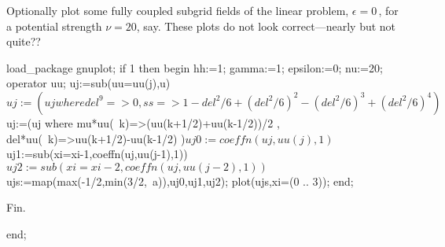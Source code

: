 \documentclass[12pt,a5paper]{article}
\begin{document}
Optionally plot some fully coupled subgrid fields of the linear problem, \(\epsilon=0\)\,, for a potential strength \(\nu=20\), say.
These plots do not look correct---nearly but not quite??
\begin{reduce}
load_package gnuplot;
if 1 then begin 
  hh:=1; %
  gamma:=1; epsilon:=0; nu:=20;
  operator uu; uj:=sub(uu=uu(j),u)$
  uj:=(uj where { del^9=>0
      , ss=>1-del^2/6+(del^2/6)^2-(del^2/6)^3+(del^2/6)^4})$
  uj:=(uj where { mu*uu(~k)=>(uu(k+1/2)+uu(k-1/2))/2
      , del*uu(~k)=>uu(k+1/2)-uu(k-1/2) })$
  uj0:=coeffn(uj,uu(j),1)$
  uj1:=sub(xi=xi-1,coeffn(uj,uu(j-1),1))$
  uj2:=sub(xi=xi-2,coeffn(uj,uu(j-2),1))$
  ujs:=map(max(-1/2,min(3/2,~a)),{uj0,uj1,uj2});
  plot(ujs,xi=(0 .. 3));
end;
\end{reduce}

Fin.
\begin{reduce}
end;
\end{reduce}



\end{document}

